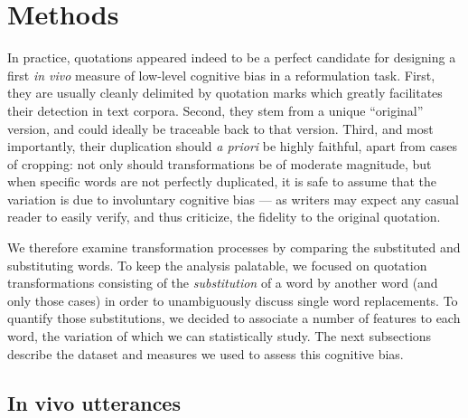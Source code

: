 \section{Methods} %
\label{sec:protocol}

In practice, quotations appeared indeed to be a perfect candidate for designing a first \emph{in vivo} measure of low-level cognitive bias in a reformulation task. %
First, they are usually cleanly delimited by quotation marks %
which greatly facilitates their detection in text corpora.
Second, they stem from a unique ``original'' version, and could ideally be traceable back to that version.
Third, and most importantly, their duplication should \emph{a priori} be highly faithful, apart from cases of cropping: not only should transformations be of moderate magnitude, but when specific words are not perfectly duplicated, it is safe to assume that the variation is due to involuntary cognitive bias --- as writers may expect any casual reader to easily verify, and thus criticize, the fidelity to the original quotation.

We therefore examine transformation processes by comparing the substituted and substituting words. To keep the analysis palatable, we focused on quotation transformations consisting of the \emph{substitution} of a word by another word (and only those cases) in order to unambiguously discuss single word replacements. 
To quantify those substitutions, we decided to associate a number of features to each word, the variation of which we can statistically study.
The next subsections describe the dataset and measures we used to assess this cognitive bias.

\subsection{In vivo utterances}

